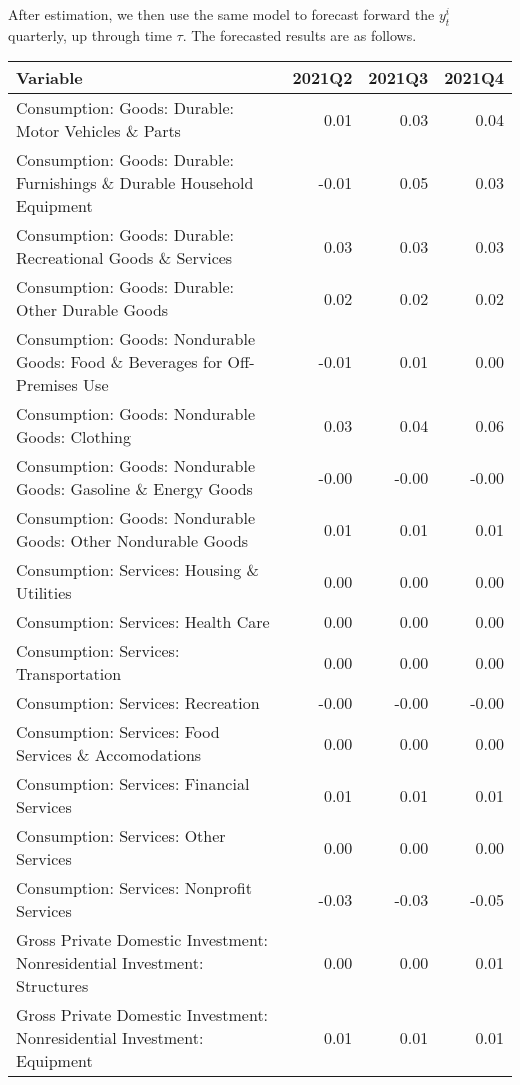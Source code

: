 \documentclass[11pt, letterpaper]{article}\usepackage[]{graphicx}\usepackage[]{color}
\begin{document}
After estimation, we then use the same model to forecast forward the $y^i_t$ quarterly, up through time $\tau$. 
The forecasted results are as follows.
\begin{table}[H]
\centering
\begingroup\scriptsize
\begin{tabular}{lrrr}
  \hline
Variable & 2021Q2 & 2021Q3 & 2021Q4 \\ 
  \hline
Consumption: Goods: Durable: Motor Vehicles \& Parts & 0.01 & 0.03 & 0.04 \\ 
  Consumption: Goods: Durable: Furnishings \& Durable Household Equipment & -0.01 & 0.05 & 0.03 \\ 
  Consumption: Goods: Durable: Recreational Goods \& Services & 0.03 & 0.03 & 0.03 \\ 
  Consumption: Goods: Durable: Other Durable Goods & 0.02 & 0.02 & 0.02 \\ 
  Consumption: Goods: Nondurable Goods: Food \& Beverages for Off-Premises Use & -0.01 & 0.01 & 0.00 \\ 
  Consumption: Goods: Nondurable Goods: Clothing & 0.03 & 0.04 & 0.06 \\ 
  Consumption: Goods: Nondurable Goods: Gasoline \& Energy Goods & -0.00 & -0.00 & -0.00 \\ 
  Consumption: Goods: Nondurable Goods: Other Nondurable Goods & 0.01 & 0.01 & 0.01 \\ 
  Consumption: Services: Housing \& Utilities & 0.00 & 0.00 & 0.00 \\ 
  Consumption: Services: Health Care & 0.00 & 0.00 & 0.00 \\ 
  Consumption: Services: Transportation & 0.00 & 0.00 & 0.00 \\ 
  Consumption: Services: Recreation & -0.00 & -0.00 & -0.00 \\ 
  Consumption: Services: Food Services \& Accomodations & 0.00 & 0.00 & 0.00 \\ 
  Consumption: Services: Financial Services & 0.01 & 0.01 & 0.01 \\ 
  Consumption: Services: Other Services & 0.00 & 0.00 & 0.00 \\ 
  Consumption: Services: Nonprofit Services & -0.03 & -0.03 & -0.05 \\ 
  Gross Private Domestic Investment: Nonresidential Investment: Structures & 0.00 & 0.00 & 0.01 \\ 
  Gross Private Domestic Investment: Nonresidential Investment: Equipment & 0.01 & 0.01 & 0.01 \\ 

\end{tabular}
\end{table}
\end{document}
